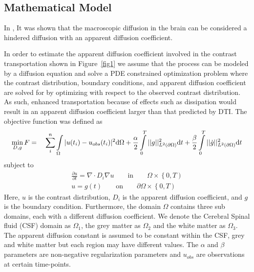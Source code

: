 \documentclass[11pt,a4paper]{article}
\begin{document}
\subsection{Mathematical Model}


In \cite{sykova2008diffusion}, It was shown that the macroscopic diffusion in the brain can be considered a hindered diffusion with an apparent diffusion coefficient. 

In order to estimate the apparent diffusion coefficient involved in the contrast transportation shown in Figure~\ref{fig1} we assume that the process can be modeled by a diffusion equation and solve a PDE constrained optimization problem where
the contrast distribution, boundary conditions, and apparent
diffusion coefficient are solved for by optimizing with
respect to the observed contrast distribution. As such, enhanced transportation because of effects such as
dissipation would result in an apparent diffusion coefficient larger than that predicted by DTI.  
The objective function was defined as 
\begin{equation}
\min_{D,g} F = \quad \sum\limits_i\sp{n} \int\limits_{\Omega} |u(t_i) - u_{obs}(t_i)|\sp{2} \mathrm{d}\Omega + \frac{\alpha}{2} \int\limits_{0}\sp{T} || g ||\sp{2}_{L\sp{2}(\partial\Omega)} \mathrm{d}t + \frac{\beta}{2} \int\limits_{0}\sp{T} || \dot{g} ||\sp{2}_{L\sp{2}(\partial\Omega)}\mathrm{d}t 
\label{EQ::objf}
\end{equation}
subject to   
\begin{equation}
\begin{aligned}
\frac{\partial u}{\partial t} = \nabla \cdot  D_i \nabla u \qquad \text{in} \qquad \Omega \times \left\lbrace 0 , T \right)  \\
u=g(t) \qquad \text{on} \qquad \partial\Omega  \times \left\lbrace 0 , T \right) 
\end{aligned}
\label{Eq::PDE}
\end{equation}
Here, $u$ is the contrast distribution, $D_i$ is the apparent diffusion 
coefficient, and $g$ is the boundary condition. Furthermore,  
the domain $\Omega$ contains three sub domains, each with a different diffusion coefficient. We denote the Cerebral Spinal fluid (CSF) domain as $\Omega_1$, the grey matter as $\Omega_2$ and the white matter as $\Omega_3$. The apparent
diffusion constant is assumed to be constant within the CSF, grey and 
white matter but each region may have different values.  
The $\alpha$ and $\beta$ parameters are non-negative regularization parameters 
and $u_{obs}$ are observations at certain time-points. 
\end{document}

